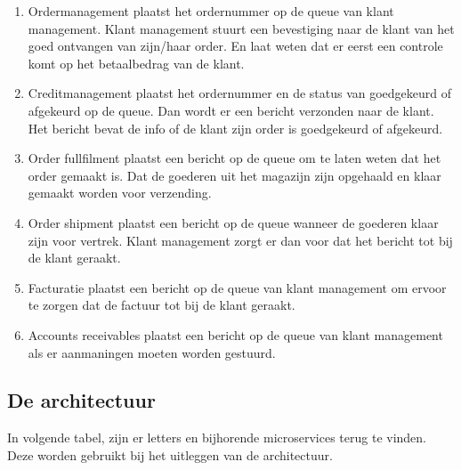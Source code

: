 \begin{enumerate}
	\item Ordermanagement plaatst het ordernummer op de queue van klant management. Klant management stuurt een bevestiging naar de klant van het goed ontvangen van zijn/haar order. En laat weten dat er eerst een controle komt op het betaalbedrag van de klant.
	\item Creditmanagement plaatst het ordernummer en de status van goedgekeurd of afgekeurd op de queue. Dan wordt er een bericht verzonden naar de klant. Het bericht bevat de info of de klant zijn order is goedgekeurd of afgekeurd.
	\item Order fullfilment plaatst een bericht op de queue om te laten weten dat het order gemaakt is. Dat de goederen uit het magazijn zijn opgehaald en klaar gemaakt worden voor verzending.
	\item Order shipment plaatst een bericht op de queue wanneer de goederen klaar zijn voor vertrek. Klant management zorgt er dan voor dat het bericht tot bij de klant geraakt.
	\item Facturatie plaatst een bericht op de queue van klant management om ervoor te zorgen dat de factuur tot bij de klant geraakt.
	\item Accounts receivables plaatst een bericht op de queue van klant management als er aanmaningen moeten worden gestuurd.
\end{enumerate}

\subsection{De architectuur}
In volgende tabel, zijn er letters en bijhorende microservices terug te vinden. Deze worden gebruikt bij het uitleggen van de architectuur.
\begin{table}[]
	\caption{Legende die gebruikt wordt in de afbeeldingen.}
\end{table}

